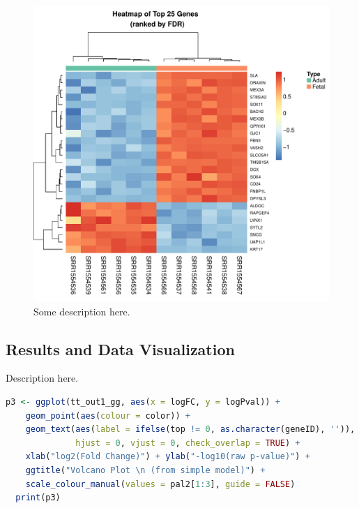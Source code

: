\documentclass[11pt]{article}
\begin{document}
\begin{figure}[H]
\centering
\includegraphics[scale=0.8]{heatmap_top25genes_simplemod.pdf}
\caption{Some description here.}
\end{figure}


\subsection{Results and Data Visualization}
Description here.

\begin{lstlisting}[language=R]
  p3 <- ggplot(tt_out1_gg, aes(x = logFC, y = logPval)) +
    geom_point(aes(colour = color)) +
    geom_text(aes(label = ifelse(top != 0, as.character(geneID), '')),
              hjust = 0, vjust = 0, check_overlap = TRUE) +
    xlab("log2(Fold Change)") + ylab("-log10(raw p-value)") +
    ggtitle("Volcano Plot \n (from simple model)") +
    scale_colour_manual(values = pal2[1:3], guide = FALSE)
  print(p3)
\end{lstlisting}
\end{document}
